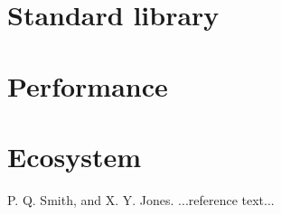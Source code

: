 \documentclass[11pt]{sigplanconf}
\begin{document}
\section{Standard library}

\section{Performance}

\section{Ecosystem}












\begin{thebibliography}{}
\softraggedright

P. Q. Smith, and X. Y. Jones. ...reference text...

\end{thebibliography}
\end{document}
